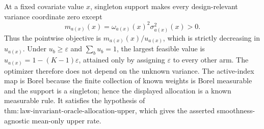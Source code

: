 At a fixed covariate value \(x\), singleton support makes every design-relevant variance coordinate zero except
\[
m_{a(x)}(x)=\omega_{a(x)}(x)^2\sigma_{a(x)}^2(x)>0.
\]
Thus the pointwise objective is \(m_{a(x)}(x)/u_{a(x)}\), which is strictly decreasing in \(u_{a(x)}\). Under \(u_b\geq\varepsilon\) and \(\sum_bu_b=1\), the largest feasible value is \(u_{a(x)}=1-(K-1)\varepsilon\), attained only by assigning \(\varepsilon\) to every other arm. The optimizer therefore does not depend on the unknown variance. The active-index map is Borel because the finite collection of known weights is Borel measurable and the support is a singleton; hence the displayed allocation is a known measurable rule. It satisfies the hypothesis of \(\mathrm{thm{:}law\text{-}invariant\text{-}oracle\text{-}allocation\text{-}upper}\), which gives the asserted smoothness-agnostic mean-only upper rate.